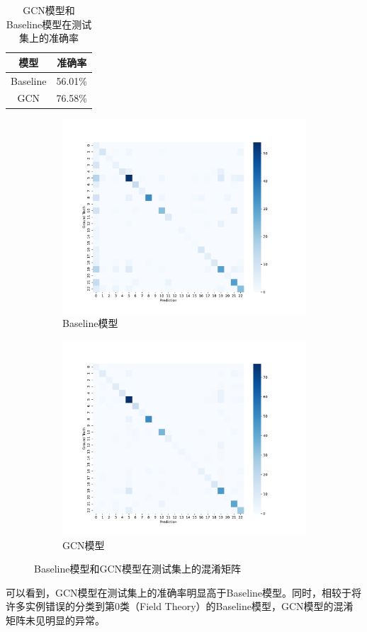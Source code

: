 \begin{table}[htbp]
    \centering
    \caption{GCN模型和Baseline模型在测试集上的准确率}
    \begin{tabular}{cc}
        \toprule
        模型 & 准确率 \\
        \midrule
        Baseline & 56.01\% \\
        GCN & 76.58\% \\
        \bottomrule
    \end{tabular}
    \label{tab:gcn_acc}
\end{table}

\begin{figure}
    \centering
    \begin{subfigure}{0.48\textwidth}
        \centering
        \includegraphics[width=\textwidth]{confusion_matrix_baseline.pdf}
        \caption{Baseline模型}
    \end{subfigure}
    \begin{subfigure}{0.48\textwidth}
        \centering
        \includegraphics[width=\textwidth]{confusion_matrix_gnn.pdf}
        \caption{GCN模型}
    \end{subfigure}
    \caption{Baseline模型和GCN模型在测试集上的混淆矩阵}
    \label{tab:gcn_confusion}
\end{figure}

可以看到，GCN模型在测试集上的准确率明显高于Baseline模型。同时，相较于将许多实例错误的分类到第0类（Field Theory）的Baseline模型，GCN模型的混淆矩阵未见明显的异常。